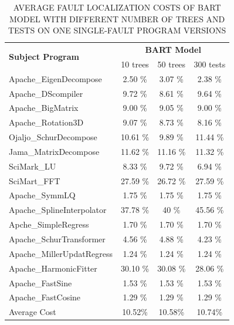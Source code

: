 \begin{table}[htbp!]
\caption{AVERAGE FAULT LOCALIZATION COSTS OF BART MODEL WITH DIFFERENT NUMBER OF TREES AND TESTS ON ONE SINGLE-FAULT PROGRAM VERSIONS }
\label{sensitivity}
\centering
      \begin{tabular}{|l|c|c|c|}
      \hline
\multirow{2}{*}{{\bf Subject Program}}	&	\multicolumn{3}{|c|}{{\bf BART Model}}	\\	\cline{2-4}
& 10 trees & 50 trees & 300 tests\\ \hline
Apache\_EigenDecompose			&	2.50	\%	&	3.07	\%	&	2.38	\%	\\ \hline
Apache\_DScompiler			&	9.72	\%	&	8.61	\%	&	9.64	\%	\\ \hline
Apache\_BigMatrix			&	9.00	\%	&	9.05	\%	&	9.00	\%	\\ \hline
Apache\_Rotation3D			&	9.07	\%	&	8.73	\%	&	8.16	\%	\\ \hline
Ojaljo\_SchurDecompose			&	10.61	\%	&	9.89	\%	&	11.44	\%	\\ \hline
Jama\_MatrixDecompose			&	11.62	\%	&	11.16	\%	&	11.32	\%	\\ \hline
SciMark\_LU			&	8.33 \%	&	9.72	\%	&	6.94	\%	\\ \hline
SciMart\_FFT			&	27.59	\%	&	26.72	\%	&	27.59	\%	\\ \hline
Apache\_SymmLQ			&	1.75	\%	&	1.75	\%	&	1.75	\%	\\ \hline
Apache\_SplineInterpolator			&	37.78	\%	&	40	\%	&	45.56	\%	\\ \hline
Apche\_SimpleRegress			&	1.70	\%	&	1.70	\%	&	1.70	\%	\\ \hline
Apache\_SchurTransformer			&	4.56	\%	&	4.88	\%	&	4.23	\%	\\ \hline
Apache\_MillerUpdatRegress			&	1.24	\%	&	1.24	\%	&	1.24	\%	\\ \hline
Apache\_HarmonicFitter			&	30.10	\%	&	30.08	\%	&	28.06	\%	\\ \hline
Apache\_FastSine			&	1.53	\%	&	1.53	\%	&	1.53	\%	\\ \hline
Apache\_FastCosine			&	1.29	\%	&	1.29	\%	&	1.29	\%	\\ \hline
Average Cost 	&	10.52\% 	&10.58\% 	&10.74\%	\\ \hline
\end{tabular}
\end{table}

